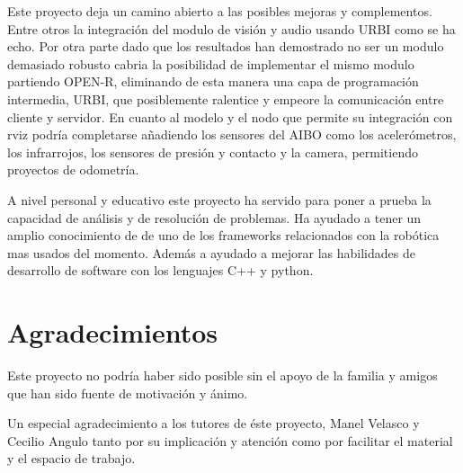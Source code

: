 \documentclass[12pt,a4paper,final,twoside]{book}
\begin{document}
Este proyecto deja un camino abierto a las posibles mejoras y complementos. Entre otros la integración del modulo de visión y audio usando URBI como se ha echo. Por otra parte dado que los resultados han demostrado no ser un modulo demasiado robusto cabria la posibilidad de implementar el mismo modulo partiendo OPEN-R, eliminando de esta manera una capa de programación intermedia, URBI, que posiblemente ralentice y empeore la comunicación entre cliente y servidor. En cuanto al modelo y el nodo que permite su integración con rviz podría completarse añadiendo los sensores del AIBO como los acelerómetros, los infrarrojos, los sensores de presión y contacto y la camera, permitiendo proyectos de odometría.

A nivel personal y educativo este proyecto ha servido para poner a prueba la capacidad de análisis y de resolución de problemas. Ha ayudado a tener un amplio conocimiento de de uno de los frameworks relacionados con la robótica mas usados del momento. Además a ayudado a mejorar las habilidades de desarrollo de software con los lenguajes C++ y python. 

\newpage
\section*{Agradecimientos}
Este proyecto no podría haber sido posible sin el apoyo de la familia y amigos que han sido fuente de motivación y ánimo.

Un especial agradecimiento a los tutores de éste proyecto, Manel Velasco y Cecilio Angulo tanto por su implicación y atención como por facilitar el material y el espacio de trabajo.
\end{document}
